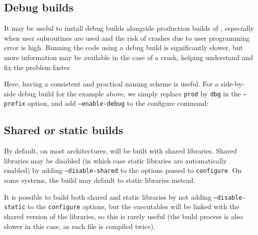 \documentclass[a4paper,10pt,twoside]{csshortdoc}
\begin{document}
\subsection{Debug builds\label{sec:config:shared}}

It may be useful to install debug builds alongside production
builds of \CS, especially when user subroutines are used
and the risk of crashes due to user programming error is high.
Running the code using a debug build is significantly
slower, but more information may be available in the case
of a crash, helping understand and fix the problem faster.

Here, having a consistent and practical naming scheme is useful.
For a side-by-side debug build for the example above, we simply replace \texttt{prod} by
\texttt{dbg} in the \texttt{--prefix} option, and add
\texttt{--enable-debug} to the configure command:


\subsection{Shared or static builds\label{sec:config:shared}}

By default, on most architectures, \CS will be built with shared libraries.
Shared libraries may be disabled (in which case static libraries
are automatically enabled) by adding  {\tt --disable-shared} to the options
passed to {\tt configure}.
On some systems, the build may default to static libraries instead.

It is possible to build both shared and static libraries by not adding
{\tt --disable-static} to the {\tt configure} options, but the
executables will be linked with the shared version of the libraries,
so this is rarely useful (the build process is also slower in this case, as
each file is compiled twice).
\end{document}
